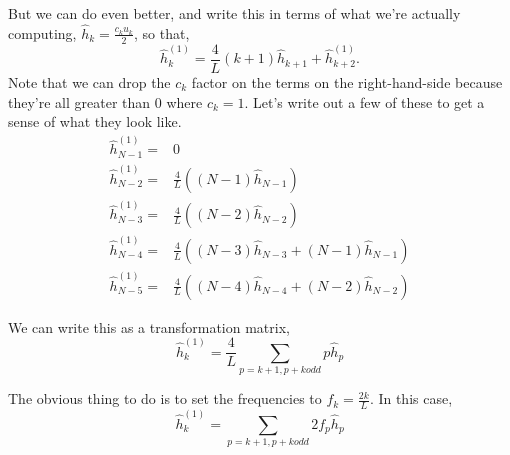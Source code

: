 \documentclass[11pt]{article}
\begin{document}
But we can do even better, and write this in terms of what we're actually computing, $\hat{h}_k = \frac{c_k \hat{u}_k}{2}$, so that,
\begin{equation}
\hat{h}_{k}^{(1)} = \frac{4}{L} (k+1) \hat{h}_{k+1} + \hat{h}_{k+2}^{(1)}.
\end{equation}
Note that we can drop the $c_k$ factor on the terms on the right-hand-side because they're all greater than $0$ where $c_k=1$. Let's write out a few of these to get a sense of what they look like.
\begin{align}
\hat{h}_{N-1}^{(1)} =& 0 \\
\hat{h}_{N-2}^{(1)} =& \frac{4}{L} \left(  (N-1) \hat{h}_{N-1} \right) \\
\hat{h}_{N-3}^{(1)} =& \frac{4}{L} \left(  (N-2) \hat{h}_{N-2} \right) \\
\hat{h}_{N-4}^{(1)} =& \frac{4}{L} \left(  (N-3) \hat{h}_{N-3} +  (N-1) \hat{h}_{N-1} \right) \\
\hat{h}_{N-5}^{(1)} =& \frac{4}{L} \left(  (N-4) \hat{h}_{N-4} + (N-2) \hat{h}_{N-2} \right) 
\end{align}

We can write this as a transformation matrix,
\begin{equation}
\hat{h}_{k}^{(1)} = \frac{4}{L} \sum_{p=k+1, p+k odd} p \hat{h}_p
\end{equation}

The obvious thing to do is to set the frequencies to $f_k = \frac{2k}{L}$. In this case,
\begin{equation}
\hat{h}_{k}^{(1)} = \sum_{p=k+1, p+k odd} 2 f_p \hat{h}_p
\end{equation}
\end{document}
